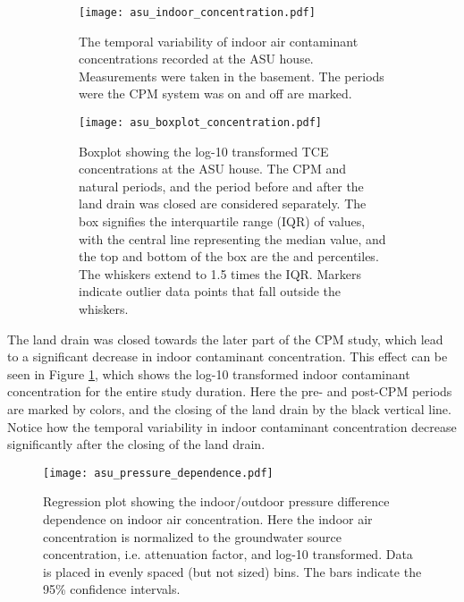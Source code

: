 \begin{figure}[htb!]
  \begin{subfigure}[t]{\textwidth}
    \centering
    \texttt{[image: asu\_indoor\_concentration.pdf]}
    \caption{The temporal variability of indoor air contaminant concentrations recorded at the ASU house. Measurements were taken in the basement. The periods were the CPM system was on and off are marked.}
    \label{fig:asu_indoor_concentration}
  \end{subfigure}
  \begin{subfigure}[t]{\textwidth}
    \texttt{[image: asu\_boxplot\_concentration.pdf]}
    \caption{Boxplot showing the log-10 transformed TCE concentrations at the ASU house. The CPM and natural periods, and the period before and after the land drain was closed are considered separately. The box signifies the interquartile range (IQR) of values, with the central line representing the median value, and the top and bottom of the box are the  and  percentiles. The whiskers extend to 1.5 times the IQR. Markers indicate outlier data points that fall outside the whiskers.}
    \label{fig:asu_concentration_boxplot}
  \end{subfigure}
  \caption{}
\end{figure}

The land drain was closed towards the later part of the CPM study, which lead to a significant decrease in indoor contaminant concentration.
This effect can be seen in Figure \ref{fig:asu_indoor_concentration}, which shows the log-10 transformed indoor contaminant concentration for the entire study duration.
Here the pre- and post-CPM periods are marked by colors, and the closing of the land drain by the black vertical line.
Notice how the temporal variability in indoor contaminant concentration decrease significantly after the closing of the land drain.\par

\begin{figure}[htb!]
  \centering
  \texttt{[image: asu\_pressure\_dependence.pdf]}
  \caption{Regression plot showing the indoor/outdoor pressure difference dependence on indoor air concentration. Here the indoor air concentration is normalized to the groundwater source concentration, i.e. attenuation factor, and log-10 transformed. Data is placed in evenly spaced (but not sized) bins. The bars indicate the 95\% confidence intervals.}
  \label{fig:asu_pressure_dependence}
\end{figure}

